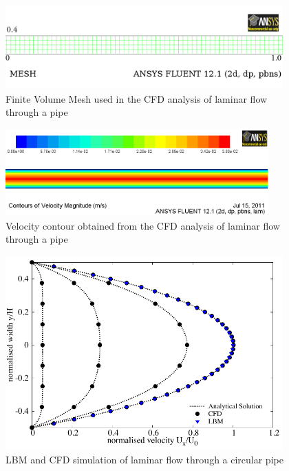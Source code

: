 \begin{figure}[htbp]
\centering
\includegraphics[width=0.95\textwidth]{CFD_Mesh}
\caption{Finite Volume Mesh used in the CFD analysis of laminar flow through a 
pipe}
\label{fig:mesh}
\end{figure}


\begin{figure}[htbp]
\centering
\includegraphics[width=0.9\textwidth]{CFD_Poiseuille}
\caption{Velocity contour obtained from the CFD analysis of laminar flow 
through a pipe}
\label{fig:cont}
\end{figure}


\begin{figure}[htbp]
\centering
\includegraphics[width=0.95\textwidth]{Poiseuille}
\caption{LBM and CFD simulation of laminar flow through a circular pipe}
\label{fig:LBM}
\end{figure}

